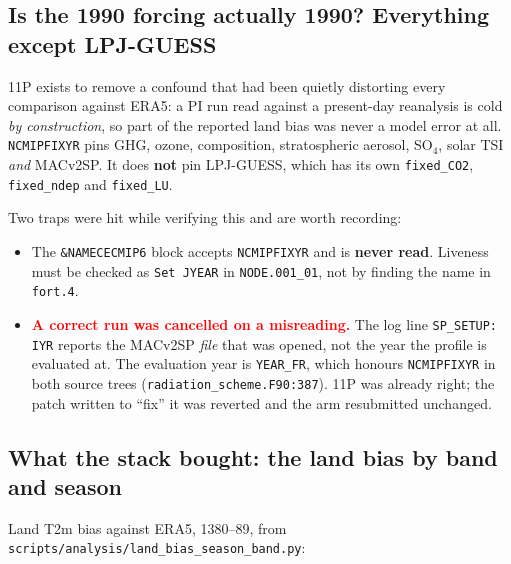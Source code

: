 \documentclass[10pt]{article}
\begin{document}
\subsection{Is the 1990 forcing actually 1990? Everything except LPJ-GUESS}\label{sub:r11forcing}

11P exists to remove a confound that had been quietly distorting every comparison against
ERA5: a PI run read against a present-day reanalysis is cold \emph{by construction}, so
part of the reported land bias was never a model error at all. \texttt{NCMIPFIXYR} pins
GHG, ozone, composition, stratospheric aerosol, SO$_4$, solar TSI \emph{and} MACv2SP.
It does \textbf{not} pin LPJ-GUESS, which has its own \texttt{fixed\_CO2},
\texttt{fixed\_ndep} and \texttt{fixed\_LU}.

Two traps were hit while verifying this and are worth recording:

\begin{itemize}\itemsep1pt
\item The \texttt{\&NAMECECMIP6} block accepts \texttt{NCMIPFIXYR} and is \textbf{never
read}. Liveness must be checked as \texttt{Set JYEAR} in \texttt{NODE.001\_01}, not by
finding the name in \texttt{fort.4}.
\item \textcolor{red}{\textbf{A correct run was cancelled on a misreading.}} The log line
\texttt{SP\_SETUP: IYR} reports the MACv2SP \emph{file} that was opened, not the year the
profile is evaluated at. The evaluation year is \texttt{YEAR\_FR}, which honours
\texttt{NCMIPFIXYR} in both source trees
(\texttt{radiation\_scheme.F90:387}). 11P was already right; the patch written to
``fix'' it was reverted and the arm resubmitted unchanged.
\end{itemize}

\subsection{What the stack bought: the land bias by band and season}\label{sub:r11land}

Land T2m bias against ERA5, 1380--89, from
\texttt{scripts/analysis/land\_bias\_season\_band.py}:
\end{document}
